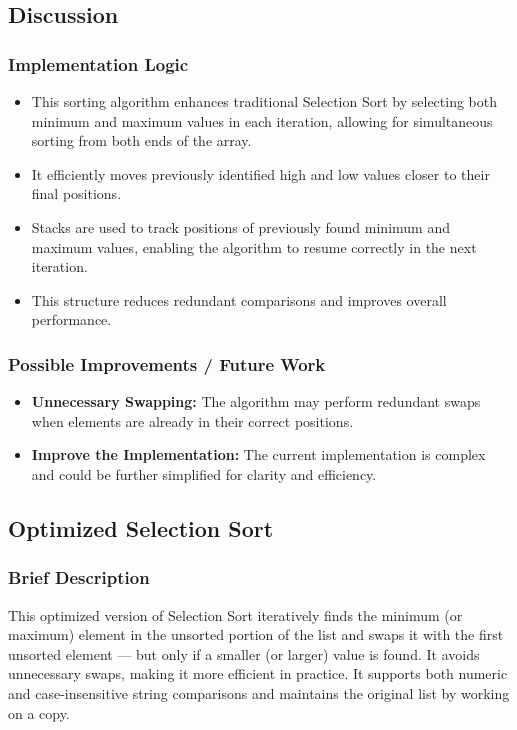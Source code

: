 \documentclass{article}
\begin{document}
\subsection*{Discussion}
\subsubsection*{Implementation Logic}
\begin{itemize}
    \item This sorting algorithm enhances traditional Selection Sort by selecting both minimum and maximum values in each iteration, allowing for simultaneous sorting from both ends of the array.
    \item It efficiently moves previously identified high and low values closer to their final positions.
    \item Stacks are used to track positions of previously found minimum and maximum values, enabling the algorithm to resume correctly in the next iteration.
    \item This structure reduces redundant comparisons and improves overall performance.
\end{itemize}
\subsubsection*{Possible Improvements / Future Work}
\begin{itemize}
    \item \textbf{Unnecessary Swapping:} The algorithm may perform redundant swaps when elements are already in their correct positions.
    \item \textbf{Improve the Implementation:} The current implementation is complex and could be further simplified for clarity and efficiency.
\end{itemize}

\subsection{Optimized Selection Sort}
\subsubsection*{Brief Description}
This optimized version of Selection Sort iteratively finds the minimum (or maximum) element in the unsorted portion of the list and swaps it with the first unsorted element — but only if a smaller (or larger) value is found. It avoids unnecessary swaps, making it more efficient in practice. It supports both numeric and case-insensitive string comparisons and maintains the original list by working on a copy.
\end{document}
